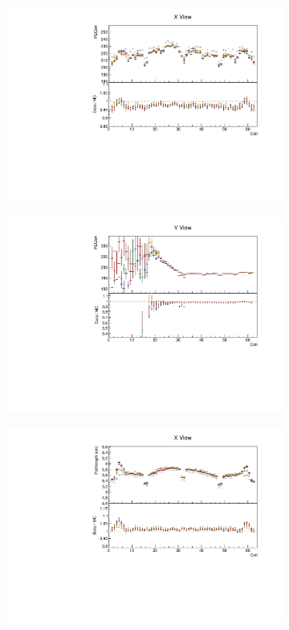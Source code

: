 \documentclass[12pt,a4paper]{article}
\begin{document}
\begin{figure}[!ht]
\begin{subfigure}{0.5\textwidth}
  \end{subfigure}
  \begin{subfigure}{0.5\textwidth}
    \includegraphics[width=\linewidth]{essentialsec_tb/pecorr_cell_x.pdf}
  \end{subfigure}
  \begin{subfigure}{0.5\textwidth}
    \includegraphics[width=\linewidth]{essentialsec_tb/pecorr_cell_y.pdf}
  \end{subfigure}
  \begin{subfigure}{0.5\textwidth}
    \includegraphics[width=\linewidth]{essentialsec_tb/cm_cell_x.pdf}

\end{subfigure}
\end{figure}
\end{document}
